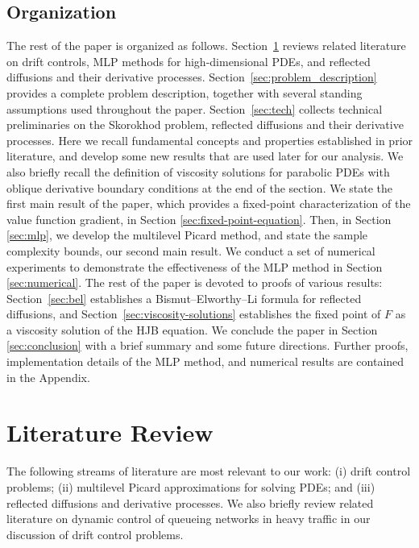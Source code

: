 \documentclass[11pt]{article}
\theoremstyle{definition}
\theoremstyle{plain}
\begin{document}
\subsection{Organization}\label{ssec:organization} 
The rest of the paper is organized as follows. 
Section~\ref{sec:related} reviews related literature on drift controls, MLP methods for high-dimensional PDEs, and reflected diffusions and their derivative processes.
Section~\ref{sec:problem_description} provides a complete problem description, together with several standing assumptions used throughout the paper. 
Section~\ref{sec:tech} collects technical preliminaries on the Skorokhod problem, reflected diffusions and their derivative processes. 
Here we recall fundamental concepts and properties established in prior literature, and develop some new results that are used later for our analysis. 
We also briefly recall the definition of viscosity solutions for parabolic PDEs with oblique derivative boundary conditions at the end of the section. 
We state the first main result of the paper, which provides a fixed-point characterization of the value function gradient, in Section \ref{sec:fixed-point-equation}. 
Then, in Section \ref{sec:mlp}, we develop the multilevel Picard method, and state the sample complexity bounds, our second main result. 
We conduct a set of numerical experiments to demonstrate the effectiveness of the MLP method in Section \ref{sec:numerical}. 
The rest of the paper is devoted to proofs of various results: 
Section~\ref{sec:bel} establishes a Bismut--Elworthy--Li formula for reflected diffusions, and 
Section~\ref{sec:viscosity-solutions} establishes the fixed point of $F$ as a viscosity solution of the HJB equation. 
We conclude the paper in Section \ref{sec:conclusion} with a brief summary and some future directions. 
Further proofs, implementation details of the MLP method, and numerical results are contained in the Appendix. 

\section{Literature Review}\label{sec:related}
The following streams of literature are most relevant to our work: (i) drift control problems; (ii) multilevel Picard approximations for solving PDEs; 
and (iii) reflected diffusions and derivative processes. We also briefly review related literature on dynamic control of queueing networks in heavy traffic 
in our discussion of drift control problems. 
\end{document}
